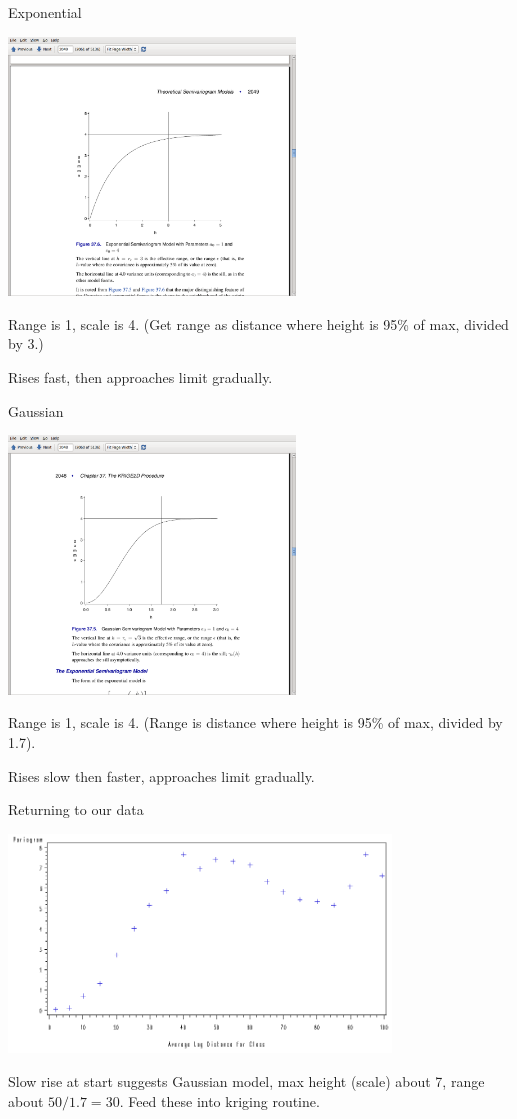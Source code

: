 \begin{frame}{Exponential}

\includegraphics[width=3in]{exponential-model}

Range is 1, scale is 4. (Get range as distance where height is 95\% of
max, divided by 3.)

Rises fast, then approaches limit gradually.

\end{frame}

\begin{frame}{Gaussian}

\includegraphics[width=3in]{gaussian-model}

Range is 1, scale is 4. (Range is distance where height is 95\% of
max, divided by 1.7).

Rises slow then faster, approaches limit gradually.

\end{frame}

\begin{frame}[fragile]{Returning to our data}


\includegraphics[width=4in]{variog1}

Slow rise at start suggests Gaussian model,  max height (scale) about
7, range about $50/1.7=30$. Feed these into kriging routine.

\end{frame}

